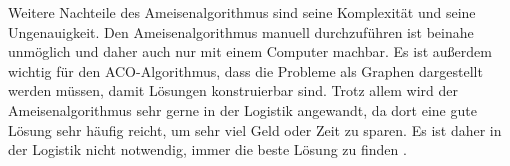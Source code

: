 \newline
Weitere Nachteile des Ameisenalgorithmus sind seine Komplexität und seine Ungenauigkeit. Den Ameisenalgorithmus manuell durchzuführen ist beinahe unmöglich und daher auch nur mit einem Computer machbar. Es ist außerdem wichtig für den ACO-Algorithmus, dass die Probleme als Graphen dargestellt werden müssen, damit Lösungen konstruierbar sind.
\newline
\newline
Trotz allem wird der Ameisenalgorithmus sehr gerne in der Logistik angewandt, da dort eine gute Lösung sehr häufig reicht, um sehr viel Geld oder Zeit zu sparen. Es ist daher in der Logistik nicht notwendig, immer die beste Lösung zu finden \citep{LogistikInfonodate}.
